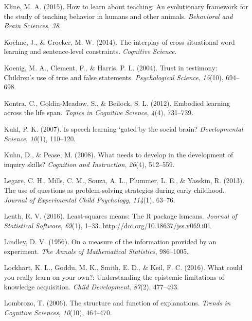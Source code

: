 \documentclass[oneside]{report}
\begin{document}
\hypertarget{ref-kline2015learn}{}
Kline, M. A. (2015). How to learn about teaching: An evolutionary
framework for the study of teaching behavior in humans and other
animals. \emph{Behavioral and Brain Sciences}, \emph{38}.

\hypertarget{ref-koehne2014interplay}{}
Koehne, J., \& Crocker, M. W. (2014). The interplay of cross-situational
word learning and sentence-level constraints. \emph{Cognitive Science}.

\hypertarget{ref-koenig2004trust}{}
Koenig, M. A., Clement, F., \& Harris, P. L. (2004). Trust in testimony:
Children's use of true and false statements. \emph{Psychological
Science}, \emph{15}(10), 694--698.

\hypertarget{ref-kontra2012embodied}{}
Kontra, C., Goldin-Meadow, S., \& Beilock, S. L. (2012). Embodied
learning across the life span. \emph{Topics in Cognitive Science},
\emph{4}(4), 731--739.

\hypertarget{ref-kuhl2007speech}{}
Kuhl, P. K. (2007). Is speech learning `gated'by the social brain?
\emph{Developmental Science}, \emph{10}(1), 110--120.

\hypertarget{ref-kuhn2008needs}{}
Kuhn, D., \& Pease, M. (2008). What needs to develop in the development
of inquiry skills? \emph{Cognition and Instruction}, \emph{26}(4),
512--559.

\hypertarget{ref-legare2013use}{}
Legare, C. H., Mills, C. M., Souza, A. L., Plummer, L. E., \& Yasskin,
R. (2013). The use of questions as problem-solving strategies during
early childhood. \emph{Journal of Experimental Child Psychology},
\emph{114}(1), 63--76.

\hypertarget{ref-lenth2016lsmeans}{}
Lenth, R. V. (2016). Least-squares means: The R package lsmeans.
\emph{Journal of Statistical Software}, \emph{69}(1), 1--33.
\url{http://doi.org/10.18637/jss.v069.i01}

\hypertarget{ref-lindley1956measure}{}
Lindley, D. V. (1956). On a measure of the information provided by an
experiment. \emph{The Annals of Mathematical Statistics}, 986--1005.

\hypertarget{ref-lockhart2016could}{}
Lockhart, K. L., Goddu, M. K., Smith, E. D., \& Keil, F. C. (2016). What
could you really learn on your own?: Understanding the epistemic
limitations of knowledge acquisition. \emph{Child Development},
\emph{87}(2), 477--493.

\hypertarget{ref-lombrozo2006structure}{}
Lombrozo, T. (2006). The structure and function of explanations.
\emph{Trends in Cognitive Sciences}, \emph{10}(10), 464--470.
\end{document}
